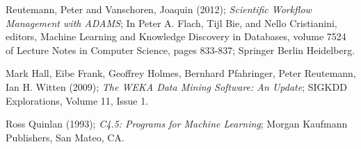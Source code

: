 \documentclass[a4paper,10pt]{book}
\begin{document}
\begin{thebibliography}{999}

		Reutemann, Peter and Vanschoren, Joaquin (2012); 
		\textit{Scientific Workflow Management with ADAMS};
		In Peter A. Flach, Tijl Bie, and Nello Cristianini, editors, 
		Machine Learning and Knowledge Discovery in Databases, 
		volume 7524 of Lecture Notes in Computer Science, pages 
		833-837; Springer Berlin Heidelberg.
		
	    Mark Hall, Eibe Frank, Geoffrey Holmes, Bernhard Pfahringer, Peter 
	    Reutemann, Ian H. Witten (2009); \textit{The WEKA Data Mining Software: An 
	    Update}; SIGKDD Explorations, Volume 11, Issue 1.
	    
	    Ross Quinlan (1993); \textit{C4.5: Programs for Machine Learning}; 
	    Morgan Kaufmann Publishers, San Mateo, CA.

\end{thebibliography}
\end{document}
